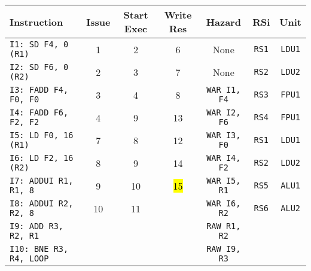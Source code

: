 \begin{enumerate}
    \begin{table}[!htp]
        \centering
        \begin{adjustbox}{width={\textwidth},totalheight={\textheight},keepaspectratio}
        \begin{tabular}{@{} l c c c c c c @{}}
            \toprule
            \textbf{Instruction} & \textbf{Issue} & \textbf{Start Exec} & \textbf{Write Res} & \textbf{Hazard} & \textbf{RSi} & \textbf{Unit} \\
            \midrule
            \texttt{I1: SD F4, 0 (R1)}      & 1 & 2 & 6 & None  & \texttt{RS1}   & \texttt{LDU1}  \\ [.5em]
            \texttt{I2: SD F6, 0 (R2)}      & 2 & 3 & 7 & None  & \texttt{RS2}   & \texttt{LDU2}  \\ [.5em]
            \texttt{I3: FADD F4, F0, F0}    & 3 & 4 & 8 & \texttt{WAR I1, F4}  & \texttt{RS3} & \texttt{FPU1} \\ [.5em]
            \texttt{I4: FADD F6, F2, F2}    & 4 & 9 & 13 & \texttt{WAR I2, F6} & \texttt{RS4} & \texttt{FPU1} \\ [.5em]
            \texttt{I5: LD F0, 16 (R1)}     & 7 & 8 & 12 & \texttt{WAR I3, F0} & \texttt{RS1} & \texttt{LDU1} \\ [.5em]
            \texttt{I6: LD F2, 16 (R2)}     & 8 & 9 & 14 & \texttt{WAR I4, F2} & \texttt{RS2} & \texttt{LDU2} \\ [.5em]
            \texttt{I7: ADDUI R1, R1, 8}    & 9 & 10 & \hl{15} & \texttt{WAR I5, R1} & \texttt{RS5} & \texttt{ALU1} \\ [.5em]
            \texttt{I8: ADDUI R2, R2, 8}    & 10 & 11 &   & \texttt{WAR I6, R2} & \texttt{RS6} & \texttt{ALU2} \\ [.5em]
            \texttt{I9: ADD R3, R2, R1}     &   &   &   & \texttt{RAW R1, R2} &       &       \\ [.5em]
            \texttt{I10: BNE R3, R4, LOOP}   &   &   &   & \texttt{RAW I9, R3} &       &       \\
            \bottomrule
        \end{tabular}
        \end{adjustbox}
    \end{table}
    

\end{enumerate}
